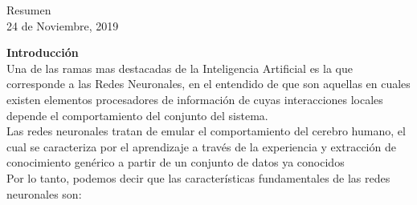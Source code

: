 \documentclass[12pt]{article}
\begin{document}
\begin{center}
\begin{minipage}{0.42\textwidth}
\begin{center}
            \end{center}
        \end{minipage}
        \vspace*{1cm}

        \vspace{2cm}
        \begin{center}
            Resumen\\
            {\large 24 de Noviembre, 2019}
        \end{center}                                                             
    \end{center}
    \newpage

    {\bf Introducción}\\
    
        Una de las ramas mas destacadas de la Inteligencia Artificial es la que corresponde a las Redes Neuronales, en el entendido de que son aquellas en cuales existen elementos procesadores de información de cuyas interacciones locales depende el comportamiento del conjunto del sistema.\\
        
        Las redes neuronales tratan de emular el comportamiento del cerebro humano, el cual se caracteriza por el aprendizaje a través de la experiencia y extracción de conocimiento genérico a partir de un conjunto de datos ya conocidos\\
        
        Por lo tanto, podemos decir que las características fundamentales de las redes neuronales son: 
        
\end{document}
